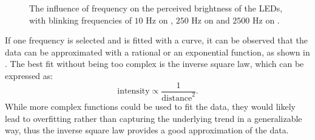 \begin{figure}[H]
    \centering
    \caption{
        The influence of frequency on the perceived brightness of the \ac{LED}s, with blinking frequencies of $10$ Hz on , $250$ Hz on  and $2500$ Hz on .
    }
\label{fig:freqs_influence}
\end{figure}
If one frequency is selected and is fitted with a curve,
it can be observed that the data can be approximated with a rational or an exponential function, as shown in .
The best fit without being too complex is the inverse square law, which can be expressed as:
\begin{equation*}
    \text{intensity} \propto \frac{1}{\text{distance}^2} .
\end{equation*}
While more complex functions could be used to fit the data, they would likely lead to overfitting rather than capturing the underlying trend in a generalizable way, thus the inverse square law provides a good approximation of the data.
